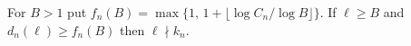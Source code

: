 For $B>1$ put $f_n(B)=\max\{1,\,1+\lfloor\log C_n/\log B\rfloor\}$. If $\ell\ge B$ and $d_n(\ell)\ge f_n(B)$ then $\ell\nmid k_n$.
